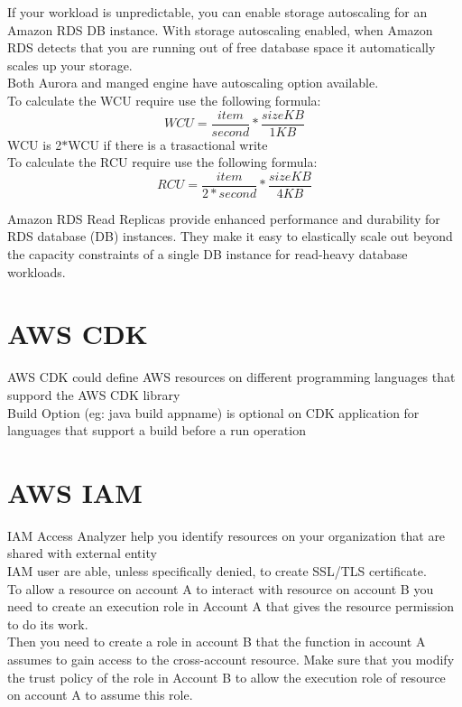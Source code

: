 \documentclass[12pt, letterpaper, twoside]{article}
\begin{document}
If your workload is unpredictable, you can enable storage autoscaling for an Amazon RDS DB instance. With storage autoscaling enabled, 
when Amazon RDS detects that you are running out of free database space it automatically scales up your storage.\\
Both Aurora and manged engine have autoscaling option available.\\

To calculate the WCU require use the following formula:\\
\[
  WCU = \frac{item}{second}*\frac{size KB}{1 KB}
\]
WCU is 2$*$WCU if there is a trasactional write\\

To calculate the RCU require use the following formula:\\
\[
  RCU = \frac{item}{2 * second}*\frac{size KB}{4 KB}
\]

Amazon RDS Read Replicas provide enhanced performance and durability for RDS database (DB) instances. 
They make it easy to elastically scale out beyond the capacity constraints of a single DB instance for 
read-heavy database workloads.\\


\section{AWS CDK}
AWS CDK could define AWS resources on different programming languages that suppord the AWS CDK 
library\\
Build Option (eg: java build appname) is optional on CDK application for languages that support a build 
before a run operation\\

\section{AWS IAM}
IAM Access Analyzer help you identify resources on your organization that are shared with external
entity\\
IAM user are able, unless specifically denied, to create SSL/TLS certificate.\\

To allow a resource on account A to interact with resource on account B you need to create an execution role in Account A 
that gives the resource permission to do its work.\\
Then you need to create a role in account B that the function in account A assumes to gain access to the cross-account resource.
Make sure that you modify the trust policy of the role in Account B to allow the execution role of resource on account A 
to assume this role.\\
\end{document}
